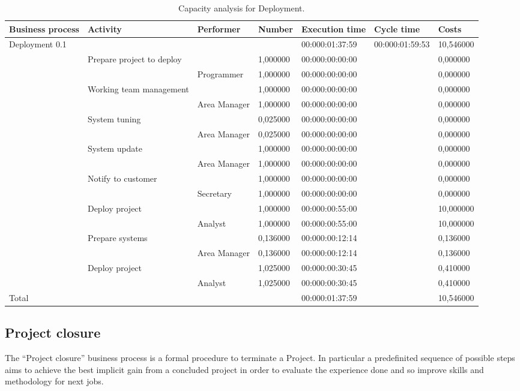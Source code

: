 \begin{landscape}
\begin{table}
\centering
{\tiny
\begin{tabular}{|l|l|l|l|l|l|l|}
Business process&Activity&Performer&Number&Execution time&Cycle time&Costs\\
\hline
Deployment 0.1&&&&00:000:01:37:59&00:000:01:59:53&10,546000\\
\hline
&Prepare project to deploy &&1,000000&00:000:00:00:00&&0,000000\\
\hline
&&Programmer &1,000000&00:000:00:00:00&&0,000000\\
\hline
&Working team management &&1,000000&00:000:00:00:00&&0,000000\\
\hline
&&Area Manager &1,000000&00:000:00:00:00&&0,000000\\
\hline
&System tuning &&0,025000&00:000:00:00:00&&0,000000\\
\hline
&&Area Manager &0,025000&00:000:00:00:00&&0,000000\\
\hline
&System update &&1,000000&00:000:00:00:00&&0,000000\\
\hline
&&Area Manager &1,000000&00:000:00:00:00&&0,000000\\
\hline
&Notify to customer &&1,000000&00:000:00:00:00&&0,000000\\
\hline
&&Secretary &1,000000&00:000:00:00:00&&0,000000\\
\hline
&Deploy project &&1,000000&00:000:00:55:00&&10,000000\\
\hline
&&Analyst &1,000000&00:000:00:55:00&&10,000000\\
\hline
&Prepare systems &&0,136000&00:000:00:12:14&&0,136000\\
\hline
&&Area Manager &0,136000&00:000:00:12:14&&0,136000\\
\hline
&Deploy project &&1,025000&00:000:00:30:45&&0,410000\\
\hline
&&Analyst &1,025000&00:000:00:30:45&&0,410000\\
\hline
Total&&&&00:000:01:37:59&&10,546000
\end{tabular}
}
\caption{Capacity analysis for Deployment.}
\end{table}
\end{landscape}
%

%

\subsection{Project closure}
The ``Project closure'' business process is a formal procedure to terminate a Project. In particular a predefinited sequence of possible steps aims to achieve the best implicit gain from a concluded project in order to evaluate the experience done and so improve skills and methodology for next jobs.

